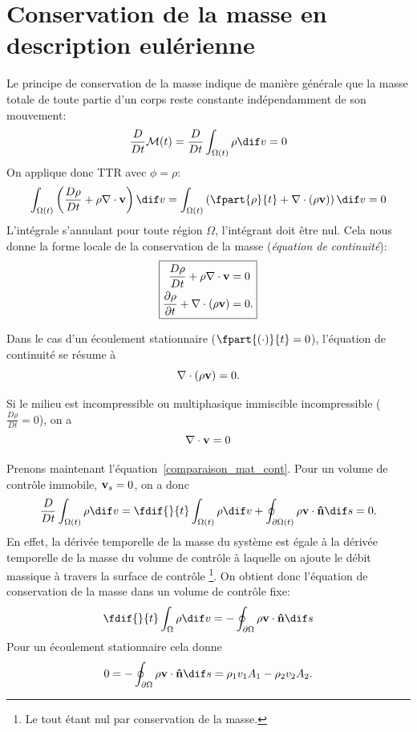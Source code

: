 \section{Conservation de la masse en description eulérienne}
Le principe de conservation de la masse indique de manière générale que la masse totale de toute partie d'un corps reste constante indépendamment de son mouvement:
\[ \frac{D}{Dt}\mathcal{M}(t)=\frac{D}{Dt}\int_{\Omega (t)}\rho \dif v = 0 \]
On applique donc TTR avec $\phi=\rho$:
\[ \int_{\Omega (t)}\left(\frac{D\rho}{Dt} + \rho\nabla\cdot\fv{v}\right) \dif v =
\int_{\Omega (t)}\left(\fpart{\rho}{t} + \nabla\cdot(\rho\fv{v})\right) \dif v = 0 \]
L'intégrale s'annulant pour toute région $\Omega$, l'intégrant doit être nul.
Cela nous donne la forme locale de la conservation de la masse (\emph{équation de continuité}):
\[ \boxed{
    \begin{aligned}
      \frac{D\rho}{Dt}+\rho\nabla\cdot\textbf{v} & = 0 \\
      \frac{\partial \rho}{\partial t}+\nabla\cdot(\rho\textbf{v}) & = 0.
    \end{aligned}
} \]

Dans le cas d'un écoulement stationnaire ($\fpart{(\cdot)}{t} = 0$),
l'équation de continuité se résume à
\[ \nabla\cdot(\rho\textbf{v}) = 0. \]

Si le milieu est incompressible ou multiphasique immiscible incompressible ($\frac{D\rho}{Dt}=0$),
on a
\[ \nabla\cdot\textbf{v} = 0 \]

Prenons maintenant l'équation~\eqref{comparaison_mat_cont}.
Pour un volume de contrôle immobile, $\textbf{v}_s = 0$, on a donc
\[ \frac{D}{Dt}\int_{\Omega (t)}\rho \dif v = \fdif{}{t}\int_{\Omega (t)}\rho  \dif v+\oint_{\partial\Omega (t)}\rho\fv{v}\cdot\fv{\^n} \dif s=0. \]
En effet, la dérivée temporelle de la masse du système est égale à la dérivée temporelle de la masse du volume de contrôle à laquelle on ajoute le débit massique à travers la surface de contrôle
\footnote{Le tout étant nul par conservation de la masse.}.
On obtient donc l'équation de conservation de la masse dans un volume de contrôle fixe:
\[ \fdif{}{t}\int_{\Omega }\rho \dif v = -\oint_{\partial\Omega} \rho\fv{v}\cdot\fv{\^n} \dif s \]
Pour un écoulement stationnaire cela donne
\[ 0 = -\oint_{\partial\Omega}\rho\fv{v}\cdot\fv{\^n} \dif s = \rho_1v_1A_1-\rho_2v_2A_2. \]

